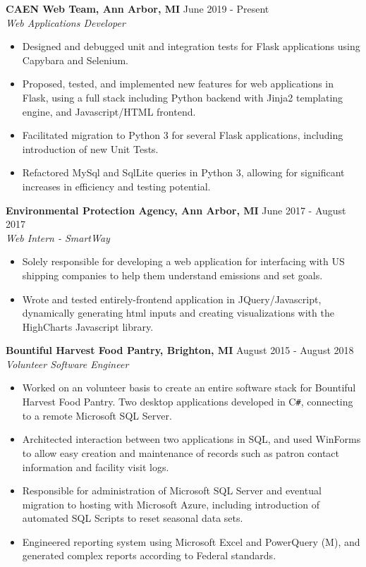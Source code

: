 \documentclass[overlapped]{res}
\begin{document}
\begin{resume}
    \textbf{CAEN Web Team, Ann Arbor, MI}
    \hfill June 2019 - Present \\
    {\sl Web Applications Developer}
    \begin{itemize}  \itemsep -2pt %
        \item Designed and debugged unit and integration tests for Flask applications using Capybara and Selenium.
        \item Proposed, tested, and implemented new features for web applications in Flask, using a full stack including Python backend with Jinja2 templating engine, and Javascript/HTML frontend.
        \item Facilitated migration to Python 3 for several Flask applications, including introduction of new Unit Tests.
        \item Refactored MySql and SqlLite queries in Python 3, allowing for significant increases in efficiency and testing potential.

    \end{itemize}
    
    \textbf{Environmental Protection Agency, Ann Arbor, MI}
    \hfill June 2017 - August 2017 \\
    {\sl Web Intern - SmartWay}
    \begin{itemize}  \itemsep -2pt %
        \item Solely responsible for developing a web application for interfacing with US shipping companies to help them understand emissions and set goals.
        \item Wrote and tested entirely-frontend application in JQuery/Javascript, dynamically generating html inputs and creating visualizations with the HighCharts Javascript library.
              
    \end{itemize}
    
    \textbf{Bountiful Harvest Food Pantry, Brighton, MI}
    \hfill August 2015 - August 2018 \\
    {\sl Volunteer Software Engineer}
    \begin{itemize}  \itemsep -2pt %
        \item Worked on an volunteer basis to create an entire software stack for Bountiful Harvest Food Pantry. Two desktop applications developed in C\texttt{\#}, connecting to a remote Microsoft SQL Server.
        \item Architected interaction between two applications in SQL, and used WinForms to allow easy creation and maintenance of records such as patron contact information and facility visit logs.
        \item Responsible for administration of Microsoft SQL Server and eventual migration to hosting with Microsoft Azure, including introduction of automated SQL Scripts to reset seasonal data sets.
        \item Engineered reporting system using Microsoft Excel and PowerQuery (M), and generated complex reports according to Federal standards.
    \end{itemize}
    

\end{resume}
\end{document}
